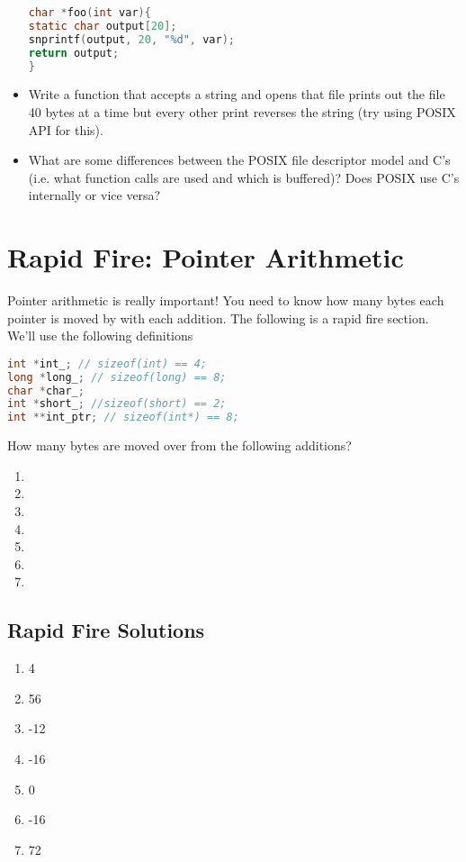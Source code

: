 \begin{itemize}
	      \begin{lstlisting}[language=C]
char *foo(int var){
static char output[20];
snprintf(output, 20, "%d", var);
return output;
}
\end{lstlisting}
	\item
	      Write a function that accepts a string and opens that file prints out the file 40 bytes at a time but every other print reverses the string (try using POSIX API for this).
	\item
	      What are some differences between the POSIX file descriptor model and C's  (i.e. what function calls are used and which is buffered)? Does POSIX use C's  internally or vice versa?
\end{itemize}

\section{Rapid Fire: Pointer Arithmetic}

Pointer arithmetic is really important! You need to know how many bytes each pointer is moved by with each addition. The following is a rapid fire section. We'll use the following definitions

\begin{lstlisting}[language=C]
int *int_; // sizeof(int) == 4;
long *long_; // sizeof(long) == 8;
char *char_;
int *short_; //sizeof(short) == 2;
int **int_ptr; // sizeof(int*) == 8;
\end{lstlisting}

How many bytes are moved over from the following additions?

\begin{enumerate}
\item {}
\item {}
\item {}
\item {}
\item {}
\item {}
\item {}
\end{enumerate}

\subsection{Rapid Fire Solutions}

\begin{enumerate}
\item 4
\item 56
\item -12
\item -16
\item 0
\item -16
\item 72
\end{enumerate}



